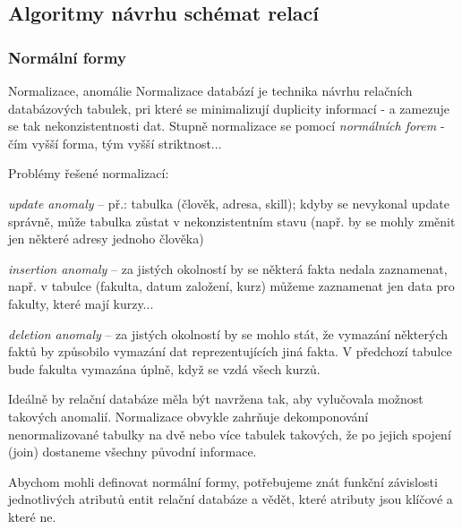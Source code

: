 \subsection{Algoritmy návrhu schémat relací}


\subsubsection*{Normální formy}

\begin{obecne}{Normalizace, anomálie}
Normalizace databází je technika návrhu relačních databázových tabulek, pri které se minimalizují duplicity informací - a zamezuje se tak nekonzistentnosti dat. Stupně normalizace se  pomocí \emph{normálních forem} - čím vyšší forma, tým vyšší striktnost...

Problémy řešené normalizací:
\begin{pitemize}
	\item \emph{update anomaly} -- př.: tabulka (člověk, adresa, skill); kdyby se nevykonal update správně, může tabulka zůstat v nekonzistentním stavu (např. by se mohly změnit jen některé adresy jednoho člověka)
	\item \emph{insertion anomaly} -- za jistých okolností by se některá fakta nedala zaznamenat, např. v tabulce (fakulta, datum založení, kurz) můžeme zaznamenat jen data pro fakulty, které mají kurzy...
	\item \emph{deletion anomaly} -- za jistých okolností by se mohlo stát, že vymazání některých faktů by způsobilo vymazání dat reprezentujících jiná fakta. V předchozí tabulce bude fakulta vymazána úplně, když se vzdá všech kurzů.
\end{pitemize}

Ideálně by relační databáze měla být navržena tak, aby vylučovala možnost takových anomalií. Normalizace obvykle zahrňuje dekomponování nenormalizované tabulky na dvě nebo více tabulek takových, že po jejich spojení (join) dostaneme všechny původní informace.

Abychom mohli definovat normální formy, potřebujeme znát funkční závislosti jednotlivých atributů entit relační databáze a vědět, které atributy jsou klíčové a které ne.
\end{obecne}

